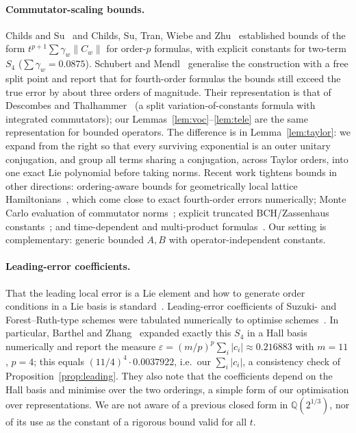\documentclass[11pt]{article}
\newcommand{\norm}[1]{\lVert #1\rVert}
\newcommand{\abs}[1]{\lvert #1\rvert}
\newcommand{\Qc}{\mathbb{Q}(2^{1/3})}
\theoremstyle{plain}
\theoremstyle{definition}
\theoremstyle{remark}
\begin{document}
\paragraph{Commutator-scaling bounds.} Childs and Su~\cite{ChildsSu2019} and Childs, Su, Tran, Wiebe and
Zhu~\cite{Childs2021} established bounds of the form $t^{p+1}\sum\gamma_w\norm{C_w}$ for order-$p$ formulas,
with explicit constants for two-term $S_4$ ($\sum\gamma_w=0.0875$). Schubert and
Mendl~\cite{SchubertMendl2023} generalise the construction with a free split point and report that for
fourth-order formulas the bounds still exceed the true error by about three orders of magnitude.
Their representation is that of Descombes and Thalhammer~\cite{DescombesThalhammer2010} (a split
variation-of-constants formula with integrated commutators); our Lemmas~\ref{lem:voc}--\ref{lem:tele}
are the same representation for bounded operators. The difference is in Lemma~\ref{lem:taylor}: we
expand from the right so that every surviving exponential is an outer unitary conjugation, and group
all terms sharing a conjugation, across Taylor orders, into one exact Lie polynomial before taking
norms. Recent work tightens bounds in other directions: ordering-aware bounds for geometrically local
lattice Hamiltonians~\cite{Liu2026}, which come close to exact fourth-order errors numerically;
Monte Carlo evaluation of commutator norms~\cite{Blunt2025}; explicit truncated BCH/Zassenhaus
constants~\cite{ArnalCasasRuizBenito2026}; and time-dependent and multi-product
formulas~\cite{ZhukRobertsonBravyi2024,AftabAnTrivisa2024,MizutaIkedaFujii2026,Mizuta2026,Bosse2025,WatsonWatkins2025}.
Our setting is complementary: generic bounded $A,B$ with operator-independent constants.

\paragraph{Leading-error coefficients.} That the leading local error is a Lie element and how to
generate order conditions in a Lie basis is standard~\cite{AuzingerHerfort2014,AKT2014,HLW2006}.
Leading-error coefficients of Suzuki- and Forest--Ruth-type schemes were tabulated numerically to optimise
schemes~\cite{McLachlan1995,Omelyan2002,Ostmeyer2023,Morales2025,MalezicOstmeyer2026}. In particular, Barthel
and Zhang~\cite{BarthelZhang2020} expanded exactly this $S_4$ in a Hall basis numerically and report the
measure $\varepsilon=(m/p)^p\sum_i\abs{c_i}\approx0.216883$ with $m=11$, $p=4$; this equals
$(11/4)^4\cdot0.0037922$, i.e.\ our $\sum_i\abs{c_i}$, a consistency check of Proposition~\ref{prop:leading}.
They also note that the coefficients depend on the Hall basis and minimise over the two orderings, a simple
form of our optimisation over representations. We are not aware of a previous closed form in $\Qc$, nor
of its use as the constant of a rigorous bound valid for all $t$.
\end{document}
